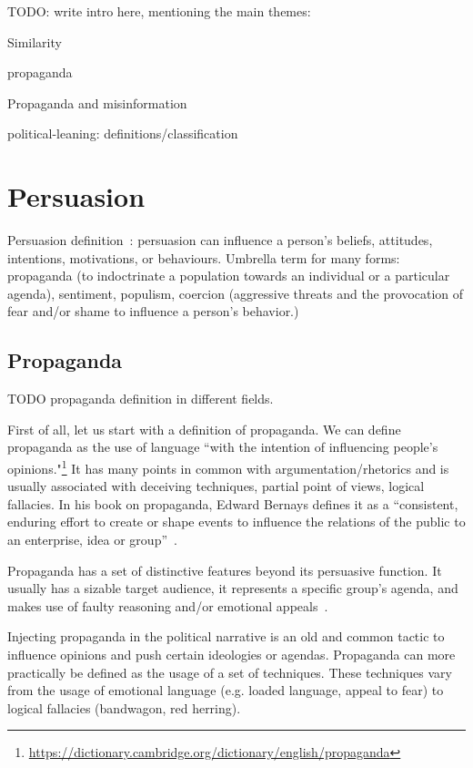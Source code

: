 \label{chap:literature}
TODO: write intro here, mentioning the main themes:

Similarity

\gls{propaganda}

Propaganda and misinformation

\Gls{political-leaning}: definitions/classification


\section{Persuasion}
\label{sec:lit_persuasion}

Persuasion definition~\cite{gass2018persuasion}: \gls{persuasion} can influence a person's beliefs, attitudes, intentions, motivations, or behaviours.
Umbrella term for many forms: \gls{propaganda} (to indoctrinate a population towards an individual or a particular agenda), sentiment, \gls{populism}, coercion (aggressive threats and the provocation of fear and/or shame to influence a person's behavior.)

\subsection{Propaganda}
\label{sec:lit_propaganda}
TODO propaganda definition in different fields.

First of all, let us start with a definition of propaganda.
We can define propaganda as the use of language ``with the intention of influencing people's opinions."\footnote{\url{https://dictionary.cambridge.org/dictionary/english/propaganda}}
It has many points in common with argumentation/rhetorics and is usually associated with deceiving techniques, partial point of views, logical fallacies.
In his book on propaganda, Edward Bernays defines it as a ``consistent, enduring effort to create or shape events to influence the relations of the public to an enterprise, idea or group''~\cite{bernays}.

Propaganda has a set of distinctive features beyond its persuasive function. It usually has a sizable target audience, it represents a specific group's agenda, and makes use of faulty reasoning and/or emotional appeals~\cite{miller1939techniques}.

Injecting propaganda in the political narrative is an old and common tactic to influence opinions and push certain ideologies or agendas.
Propaganda can more practically be defined as the usage of a set of techniques. These techniques vary from the usage of emotional language (e.g. loaded language, appeal to fear) to logical fallacies (bandwagon, red herring).

